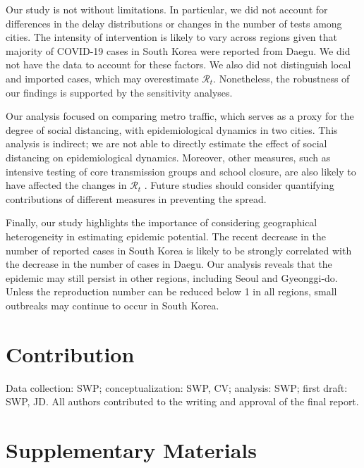 \documentclass[12pt]{article}
\begin{document}
Our study is not without limitations.
In particular, we did not account for differences in the delay distributions or changes in the number of tests among cities.
The intensity of intervention is likely to vary across regions given that majority of COVID-19 cases in South Korea were reported from Daegu.
We did not have the data to account for these factors.
We also did not distinguish local and imported cases, which may overestimate $\mathcal R_t$.
Nonetheless, the robustness of our findings is supported by the sensitivity analyses.

Our analysis focused on comparing metro traffic, which serves as a proxy for the degree of social distancing, with epidemiological dynamics in two cities.
This analysis is indirect; we are not able to directly estimate the effect of social distancing on epidemiological dynamics.
Moreover, other measures, such as intensive testing of core transmission groups and school closure, are also likely to have affected the changes in $\mathcal R_t$ \citep{kcdc}.
Future studies should consider quantifying contributions of different measures in preventing the spread.

Finally, our study highlights the importance of considering geographical heterogeneity in estimating epidemic potential.
The recent decrease in the number of reported cases in South Korea is likely to be strongly correlated with the decrease in the number of cases in Daegu.
Our analysis reveals that the epidemic may still persist in other regions, including Seoul and Gyeonggi-do.
Unless the reproduction number can be reduced below 1 in all regions, small outbreaks may continue to occur in South Korea.

\section*{Contribution}

Data collection: SWP; conceptualization: SWP, CV; analysis: SWP; first draft: SWP, JD. All authors contributed to the writing and approval of the final report.

\pagebreak



\pagebreak

\renewcommand\thefigure{S\arabic{figure}}
\setcounter{figure}{0}    

\section*{Supplementary Materials}
\end{document}
